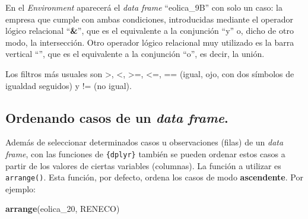 \documentclass[
]{book}
\newenvironment{Shaded}{\begin{snugshade}}{\end{snugshade}}
\newcommand{\FunctionTok}[1]{\textcolor[rgb]{0.13,0.29,0.53}{\textbf{#1}}}
\newcommand{\NormalTok}[1]{#1}
\begin{document}
En el \emph{Environment} aparecerá el \emph{data frame} ``eolica\_9B'' con solo un caso: la empresa que cumple con ambas condiciones, introducidas mediante el operador lógico relacional ``\textbf{\&}'', que es el equivalente a la conjunción ``y'' o, dicho de otro modo, la intersección. Otro operador lógico relacional muy utilizado es la barra vertical ``\textbf{\textbar{}}'', que es el equivalente a la conjunción ``o'', es decir, la unión.

Los filtros más usuales son \textgreater, \textless, \textgreater=, \textless=, == (igual, ojo, con dos símbolos de igualdad seguidos) y != (no igual).

\subsection{\texorpdfstring{Ordenando casos de un \emph{data frame}.}{Ordenando casos de un data frame.}}\label{ordenando-casos-de-un-data-frame.}

Además de seleccionar determinados casos u observaciones (filas) de un \emph{data frame}, con las funciones de \texttt{\{dplyr\}} también se pueden ordenar estos casos a partir de los valores de ciertas variables (columnas). La función a utilizar es \texttt{arrange()}. Esta función, por defecto, ordena los casos de modo \textbf{ascendente}. Por ejemplo:

\begin{Shaded}
\begin{Highlighting}[]
\FunctionTok{arrange}\NormalTok{(eolica\_20, RENECO)}
\end{Highlighting}
\end{Shaded}
\end{document}
